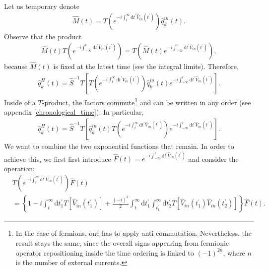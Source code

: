 \documentclass[
11pt, %
english, %
singlespacing, %
headsepline, %
]{MastersDoctoralThesis} %
\begin{document}
Let us temporary denote 
\begin{equation}
\begin{split}
	\hat{M}(t) = T\left(
	e^{-i\int_{t}^{\infty}\mathrm{d}t^{\prime} \hat{V}_{in}(t^{\prime})}	
	\right)	
	\hat{q}^{in}_{\underline{k}}(t)	
	.
\end{split}
\end{equation}
Observe that the product 
\begin{equation}
\begin{split}
	\hat{M}(t)
T
\left( 
 e^{-i\int_{-\infty}^{t}\mathrm{d}t^{\prime} \hat{V}_{in}(t^{\prime})}
\right)	
	 = 	
	 T
\left( 
\hat{M}(t)
 e^{-i\int_{-\infty}^{t}\mathrm{d}t^{\prime} \hat{V}_{in}(t^{\prime})}
\right) 
	,
\end{split}
\end{equation}
because $ \hat{M}(t) $ is fixed at the latest time (see the integral limits). Therefore,
\begin{equation}
\begin{split}
\hat{q}^{H}_{\underline{k}}(t)
=
\hat{S}^{-1} 
T
\left[ 
T
\left( 
 e^{-i\int_{t}^{\infty}\mathrm{d}t^{\prime} \hat{V}_{in}(t^{\prime})}
\right)
\hat{q}^{in}_{\underline{k}}(t)
 e^{-i\int_{-\infty}^{t}\mathrm{d}t^{\prime} \hat{V}_{in}(t^{\prime})}
\right] 
	.
\end{split}
\end{equation}
Inside of a $ T $-product, the factors commute\footnote{In the case of fermions, one has to apply anti-commutation. Nevertheless, the result stays the same, since the overall signs appearing from fermionic operator repositioning inside the time ordering is linked to $ (-1)^{2n} $, where $n $ is the number of external currents.} and can be written in any order (see appendix \ref{chronological_time}). In particular,
\begin{equation}\label{GML_v0.3}
\begin{split}
\hat{q}^{H}_{\underline{k}}(t)
=
\hat{S}^{-1} 
T
\left[ 
\hat{q}^{in}_{\underline{k}}(t)
T
\left( 
 e^{-i\int_{t}^{\infty}\mathrm{d}t^{\prime} \hat{V}_{in}(t^{\prime})}
\right)
 e^{-i\int_{-\infty}^{t}\mathrm{d}t^{\prime} \hat{V}_{in}(t^{\prime})}
\right] 
	.
\end{split}
\end{equation} 
We want to combine the two exponential functions that remain. In order to achieve this, we first first introduce $\hat{F}(t)
=
 e^{-i\int_{-\infty}^{t}\mathrm{d}t^{\prime} \hat{V}_{in}(t^{\prime})}
$ and consider the operation:
\begin{equation}\label{Moving_f_inside}
\begin{split}
& T
\left( 
 e^{-i\int_{t}^{\infty}\mathrm{d}t^{\prime} \hat{V}_{in}(t^{\prime})}
\right)
\hat{F}(t)
\\
&=
\left\lbrace 
1 
-
i
\int_{t}^{\infty}\mathrm{d}t^{\prime}_{1}
 T
 \left[ 
 \hat{V}_{in}(t^{\prime}_{1})
 \right] 
+
\frac{(-i)^{2}}{2}
\int_{t}^{\infty}\mathrm{d}t^{\prime}_{1}
\int_{t^{\prime}_{1}}^{\infty}\mathrm{d}t^{\prime}_{2}
 T
 \left[ 
 \hat{V}_{in}(t^{\prime}_{1})\hat{V}_{in}(t^{\prime}_{2})
 \right] 
\right\rbrace
\hat{F}(t)
.
\end{split}
\end{equation} 
\end{document}

